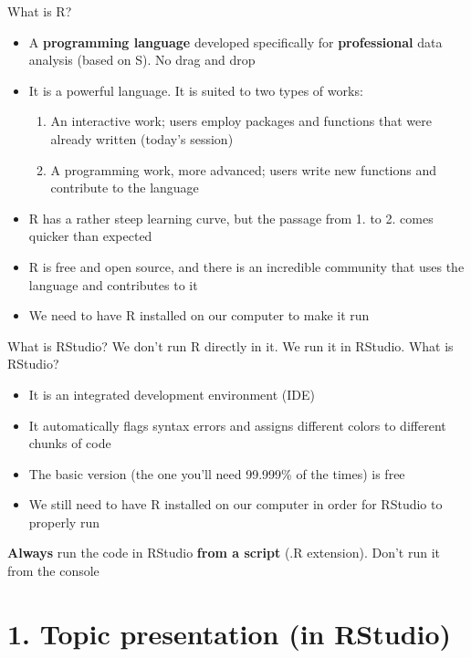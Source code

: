 \documentclass[xcolor=table,dvipsnames]{beamer}
\begin{document}
\begin{frame}{What is R?}
\begin{itemize}
\item A \textbf{programming language} developed specifically for \textbf{professional} data analysis (based on S). \pause No drag and drop \pause
\item It is a powerful language. It is suited to two types of works: \pause
	\begin{enumerate}
	\item An interactive work; users employ packages and functions that were already written (today's session) \pause
	\item A programming work, more advanced; users write new functions and contribute to the language \pause
	\end{enumerate}
\item R has a rather steep learning curve, but the passage from 1. to 2. comes quicker than expected \pause
\item R is free and open source, and there is an incredible community that uses the language and contributes to it \pause
\item We need to have R installed on our computer to make it run
\end{itemize}
\end{frame}

\begin{frame}{What is RStudio?}
We don't run R directly in it. We run it in RStudio. \pause What is RStudio? \pause
\begin{itemize}
\item It is an integrated development environment (IDE) \pause
\item It automatically flags syntax errors and assigns different colors to different chunks of code \pause
\item The basic version (the one you'll need 99.999\% of the times) is free \pause
\item We still need to have R installed on our computer in order for RStudio to properly run \pause
\end{itemize}

\textbf{Always} run the code in RStudio \textbf{from a script} (.R extension). \pause Don't run it from the console
\end{frame}

\section{1. Topic presentation (in RStudio)}
\end{document}

